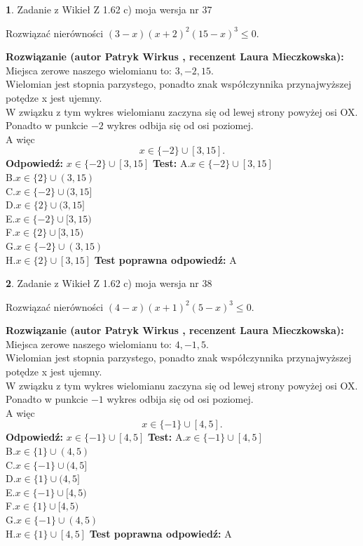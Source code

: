 \documentclass[12pt, a4paper]{article}
\theoremstyle{definition} %
\newtheorem{zad}{}
\newcommand{\zadStart}[1]{\begin{zad}#1\newline}
\newcommand{\zadStop}{\end{zad}}
\newcommand{\rozwStart}[2]{\noindent \textbf{Rozwiązanie (autor #1 , recenzent #2): }\newline}
\newcommand{\rozwStop}{\newline}
\newcommand{\odpStart}{\noindent \textbf{Odpowiedź:}\newline}
\newcommand{\odpStop}{\newline}
\newcommand{\testStart}{\noindent \textbf{Test:}\newline}
\newcommand{\testStop}{\newline}
\newcommand{\kluczStart}{\noindent \textbf{Test poprawna odpowiedź:}\newline}
\newcommand{\kluczStop}{\newline}
\begin{document}
\zadStart{Zadanie z Wikieł Z 1.62 c) moja wersja nr 37}

Rozwiązać nierówności $(3-x)(x+2)^{2}(15-x)^{3}\le0$.
\zadStop
\rozwStart{Patryk Wirkus}{Laura Mieczkowska}
Miejsca zerowe naszego wielomianu to: $3, -2, 15$.\\
Wielomian jest stopnia parzystego, ponadto znak współczynnika przy\linebreak najwyższej potędze x jest ujemny.\\ W związku z tym wykres wielomianu zaczyna się od lewej strony powyżej osi OX.\\
Ponadto w punkcie $-2$ wykres odbija się od osi poziomej.\\
A więc $$x \in \{-2\} \cup [3,15].$$
\rozwStop
\odpStart
$x \in \{-2\} \cup [3,15]$
\odpStop
\testStart
A.$x \in \{-2\} \cup [3,15]$\\
B.$x \in \{2\} \cup (3,15)$\\
C.$x \in \{-2\} \cup (3,15]$\\
D.$x \in \{2\} \cup (3,15]$\\
E.$x \in \{-2\} \cup [3,15)$\\
F.$x \in \{2\} \cup [3,15)$\\
G.$x \in \{-2\} \cup (3,15)$\\
H.$x \in \{2\} \cup [3,15]$
\testStop
\kluczStart
A
\kluczStop



\zadStart{Zadanie z Wikieł Z 1.62 c) moja wersja nr 38}

Rozwiązać nierówności $(4-x)(x+1)^{2}(5-x)^{3}\le0$.
\zadStop
\rozwStart{Patryk Wirkus}{Laura Mieczkowska}
Miejsca zerowe naszego wielomianu to: $4, -1, 5$.\\
Wielomian jest stopnia parzystego, ponadto znak współczynnika przy\linebreak najwyższej potędze x jest ujemny.\\ W związku z tym wykres wielomianu zaczyna się od lewej strony powyżej osi OX.\\
Ponadto w punkcie $-1$ wykres odbija się od osi poziomej.\\
A więc $$x \in \{-1\} \cup [4,5].$$
\rozwStop
\odpStart
$x \in \{-1\} \cup [4,5]$
\odpStop
\testStart
A.$x \in \{-1\} \cup [4,5]$\\
B.$x \in \{1\} \cup (4,5)$\\
C.$x \in \{-1\} \cup (4,5]$\\
D.$x \in \{1\} \cup (4,5]$\\
E.$x \in \{-1\} \cup [4,5)$\\
F.$x \in \{1\} \cup [4,5)$\\
G.$x \in \{-1\} \cup (4,5)$\\
H.$x \in \{1\} \cup [4,5]$
\testStop
\kluczStart
A
\kluczStop
\end{document}
